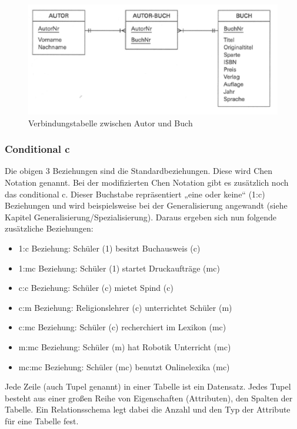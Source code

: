 \begin{figure}[H]
    \centering
    \includegraphics[width=.8\textwidth]{Content/images/modellierung/autorbuch.png}
    \caption{Verbindungstabelle zwischen Autor und Buch}
    \label{fig:modellierung:mn}
\end{figure}

\subsubsection{Conditional c}

Die obigen 3 Beziehungen sind die Standardbeziehungen. Diese wird Chen Notation genannt. Bei der modifizierten Chen Notation gibt es zusätzlich noch das conditional c. Dieser Buchstabe repräsentiert „eine oder keine“ (1:c) Beziehungen und wird beispielsweise bei der Generalisierung angewandt (siehe Kapitel Generalisierung/Spezialisierung). Daraus ergeben sich nun folgende zusätzliche Beziehungen:

\begin{itemize}
    \item 1:c Beziehung: Schüler (1) besitzt Buchausweis (c)
    \item 1:mc Beziehung: Schüler (1) startet Druckaufträge (mc)
    \item c:c Beziehung: Schüler (c) mietet Spind (c)
    \item c:m Beziehung: Religionslehrer (c) unterrichtet Schüler (m)
    \item c:mc Beziehung: Schüler (c) recherchiert im Lexikon (mc)
    \item m:mc Beziehung: Schüler (m) hat Robotik Unterricht (mc)
    \item mc:mc Beziehung: Schüler (mc) benutzt Onlinelexika (mc)
\end{itemize}

Jede Zeile (auch Tupel genannt) in einer Tabelle ist ein Datensatz. Jedes Tupel besteht aus einer großen Reihe von Eigenschaften (Attributen), den Spalten der Tabelle. Ein Relationsschema legt dabei die Anzahl und den Typ der Attribute für eine Tabelle fest.

